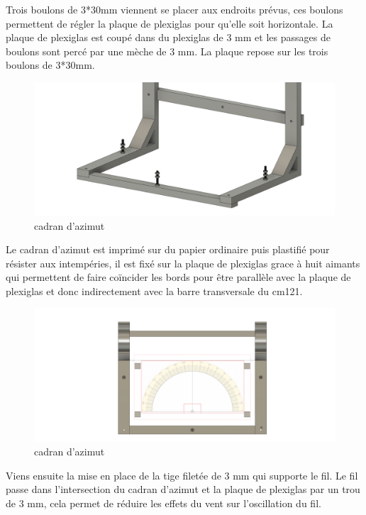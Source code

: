 \documentclass[12pt,a4paper]{article}
\begin{document}
\begin{flushleft}
Trois boulons de 3*30mm viennent se placer aux endroits prévus, ces boulons permettent de régler la plaque de plexiglas pour qu'elle soit horizontale. La plaque de plexiglas est coupé dans du plexiglas de 3 mm et les passages de boulons sont percé par une mèche de 3 mm. La plaque repose sur les trois boulons de 3*30mm.\\

\begin{figure}[H]
\centering
\includegraphics[width=12cm]{image/montage/boussole_solaire/6.png} 
\caption{cadran d'azimut}
\end{figure}

Le cadran d'azimut est imprimé sur du papier ordinaire puis plastifié pour résister aux intempéries, il est fixé sur la plaque de plexiglas grace à huit aimants qui permettent de faire coïncider les bords pour être parallèle avec la plaque de plexiglas et donc indirectement avec la barre transversale du cm121.\\

\begin{figure}[H]
\centering
\includegraphics[width=12cm]{image/montage/boussole_solaire/5.png} 
\caption{cadran d'azimut}
\end{figure}


Viens ensuite la mise en place de la tige filetée de 3 mm qui supporte le fil. Le fil passe dans l'intersection du cadran d'azimut et la plaque de plexiglas par un trou de 3 mm, cela permet de réduire les effets du vent sur l'oscillation du fil.\\


\end{flushleft}
\end{document}
